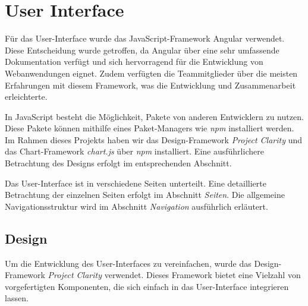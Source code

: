 \section{User Interface}

Für das User-Interface wurde das JavaScript-Framework Angular verwendet. 
Diese Entscheidung wurde getroffen, da Angular über eine sehr umfassende 
Dokumentation verfügt und sich hervorragend für die Entwicklung von 
Webanwendungen eignet. Zudem verfügten die Teammitglieder über die meisten 
Erfahrungen mit diesem Framework, was die Entwicklung und Zusammenarbeit 
erleichterte. \newline

\noindent In JavaScript besteht die Möglichkeit, 
Pakete von anderen Entwicklern zu nutzen. Diese Pakete können mithilfe eines 
Paket-Managers wie \textit{npm} installiert werden. Im Rahmen dieses Projekts 
haben wir das Design-Framework \textit{Project Clarity} und das 
Chart-Framework \textit{chart.js} über \textit{npm} installiert.
Eine ausführlichere Betrachtung des Designs erfolgt im entsprechenden Abschnitt. \newline

\noindent Das User-Interface ist in verschiedene Seiten unterteilt. 
Eine detaillierte Betrachtung der einzelnen Seiten erfolgt im Abschnitt \textit{Seiten}. 
Die allgemeine Navigationsstruktur wird im Abschnitt \textit{Navigation} ausführlich erläutert.


\subsection{Design}

Um die Entwicklung des User-Interfaces zu vereinfachen, wurde das Design-Framework
\textit{Project Clarity} verwendet. Dieses Framework bietet eine Vielzahl von
vorgefertigten Komponenten, die sich einfach in das User-Interface integrieren lassen.


